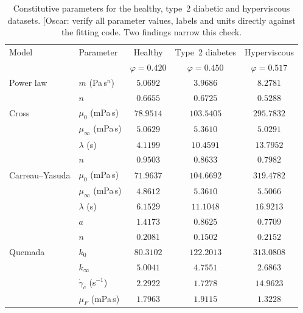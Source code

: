 \documentclass[lineno]{jfm}
\begin{document}
\begin{table}
  \centering
  \begin{tabular}{llccc}
    \toprule
    Model & Parameter & Healthy & Type~2 diabetes & Hyperviscous \\
          &           & $\varphi=0.420$ & $\varphi=0.450$ & $\varphi=0.517$ \\
    \midrule
    Power law       & $m$ (Pa\,s$^{n}$)      & $5.0692$ & $3.9686$ & $8.2781$ \\
                    & $n$                    & $0.6655$ & $0.6725$ & $0.5288$ \\
    \midrule
    Cross           & $\mu_0$ (mPa\,s)       & $78.9514$ & $103.5405$ & $295.7832$ \\
                    & $\mu_\infty$ (mPa\,s)  & $5.0629$  & $5.3610$   & $5.0291$ \\
                    & $\lambda$ (s)          & $4.1199$  & $10.4591$  & $13.7952$ \\
                    & $n$                    & $0.9503$  & $0.8633$   & $0.7982$ \\
    \midrule
    Carreau--Yasuda & $\mu_0$ (mPa\,s)       & $71.9637$ & $104.6692$ & $319.4782$ \\
                    & $\mu_\infty$ (mPa\,s)  & $4.8612$  & $5.3610$   & $5.5066$ \\
                    & $\lambda$ (s)          & $6.1529$  & $11.1048$  & $16.9213$ \\
                    & $a$                    & $1.4173$  & $0.8625$   & $0.7709$ \\
                    & $n$                    & $0.2081$  & $0.1502$   & $0.2152$ \\
    \midrule
    Quemada         & $k_0$                  & $80.3102$ & $122.2013$ & $313.0808$ \\
                    & $k_\infty$             & $5.0041$  & $4.7551$   & $2.6863$ \\
                    & $\dot\gamma_c$ (s$^{-1}$)
                                             & $2.2922$  & $1.7278$   & $14.9623$ \\
                    & $\mu_F$ (mPa\,s)       & $1.7963$  & $1.9115$   & $1.3228$ \\
    \bottomrule
  \end{tabular}
  \caption{Constitutive parameters for the healthy, type~2 diabetic and
  hyperviscous datasets.
  {\color{red}[Oscar: verify all parameter values, labels and units directly
  against the fitting code. Two findings narrow this check.
}}
\end{table}
\end{document}

